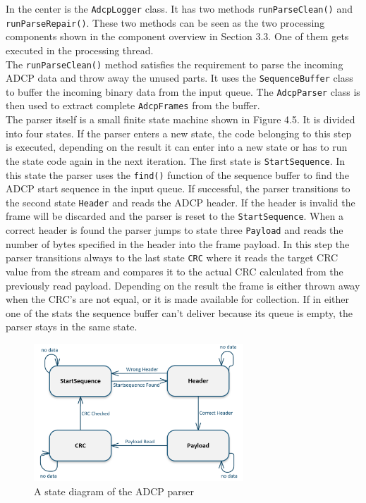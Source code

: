 In the center is the \texttt{AdcpLogger} class. It has two methods \texttt{runParseClean()} and \texttt{runParseRepair()}. These two methods can be seen as the two processing components shown in the component overview in Section 3.3. One of them gets executed in the processing thread.\\
The \texttt{runParseClean()} method satisfies the requirement to parse the incoming ADCP data and throw away the unused parts. It uses the \texttt{SequenceBuffer} class to buffer the incoming binary data from the input queue. The \texttt{AdcpParser} class is then used to extract complete \texttt{AdcpFrames} from the buffer.\\
The parser itself is a small finite state machine shown in Figure 4.5. It is divided into four states. If the parser enters a new state, the code belonging to this step is executed, depending on the result it can enter into a new state or has to run the state code again in the next iteration. The first state is \texttt{StartSequence}. In this state the parser uses the \texttt{find()} function of the sequence buffer to find the ADCP start sequence in the input queue. If successful, the parser transitions to the second state \texttt{Header} and reads the ADCP header. If the header is invalid the frame will be discarded and the parser is reset to the \texttt{StartSequence}. When a correct header is found the parser jumps to state three \texttt{Payload} and reads the number of bytes specified in the header into the frame payload. In this step the parser transitions always to the last state \texttt{CRC} where it reads the target CRC value from the stream and compares it to the actual CRC calculated from the previously read payload. Depending on the result the frame is either thrown away when the CRC's are not equal, or it is made available for collection. If in either one of the stats the sequence buffer can't deliver because its queue is empty, the parser stays in the same state.

\begin{figure}[h]
\centering
      \includegraphics[width=0.7\textwidth]{parser}
        \caption{A state diagram of the ADCP parser}
\end{figure}

